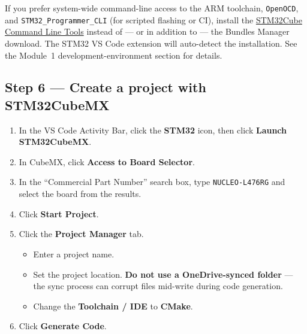 \documentclass[11pt,letterpaper]{article}
\begin{document}
\begin{tcolorbox}[infobox={Optional --- STM32Cube \CLT{}}]
	If you prefer system-wide command-line access to the ARM toolchain, \texttt{OpenOCD}, and \texttt{STM32\_Programmer\_CLI} (for scripted flashing or \mbox{CI}), install the \href{https://www.st.com/en/development-tools/stm32cubeclt.html}{STM32Cube Command Line Tools} instead of --- or in addition to --- the Bundles Manager download. The STM32 VS Code extension will auto-detect the \CLT{} installation. See the Module~1 development-environment section for details.
\end{tcolorbox}

\newpage
\subsection{Step 6 --- Create a project with STM32CubeMX}
\begin{enumerate}[leftmargin=2em]
	\item In the VS Code Activity Bar, click the \textbf{STM32} icon, then click \textbf{Launch STM32CubeMX}.
	\item In CubeMX, click \textbf{Access to Board Selector}.
	\item In the ``Commercial Part Number'' search box, type \texttt{NUCLEO-L476RG} and select the board from the results.
	\item Click \textbf{Start Project}.
	\item Click the \textbf{Project Manager} tab.
	\begin{itemize}[leftmargin=1.2em, topsep=2pt, itemsep=2pt]
		\item Enter a project name.
		\item Set the project location. \textbf{Do not use a OneDrive-synced folder} --- the sync process can corrupt files mid-write during code generation.
		\item Change the \textbf{Toolchain / IDE} to \textbf{CMake}.
	\end{itemize}
	\item Click \textbf{Generate Code}.
\end{enumerate}


\newpage
\end{document}
